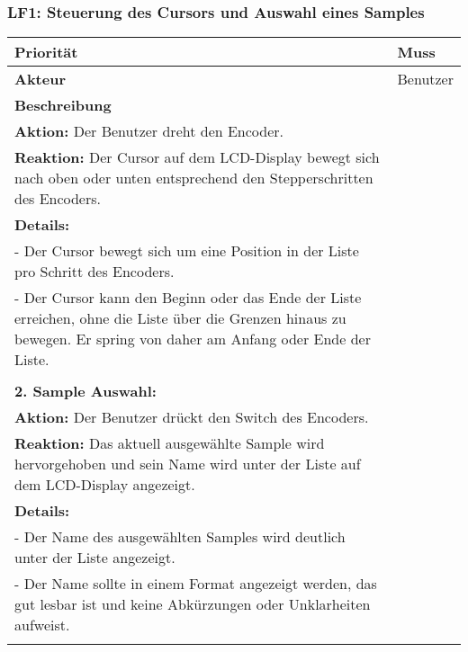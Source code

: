 \subsubsection{LF1: Steuerung des Cursors und Auswahl eines Samples}
	\hypertarget{LF01_Link}{}
\begin{longtable}[c]{|p{3cm}|p{13cm}|}
	\hline
	\textbf{Priorität} & Muss \\
	\hline
	\textbf{Akteur} & Benutzer \\
	\hline
	\textbf{Beschreibung} & 
	\begin{tabularx}{13cm}{X}
		\textbf{1. Cursor Bewegung:} \\
		\textbf{Aktion:} Der Benutzer dreht den Encoder. \\
		\textbf{Reaktion:} Der Cursor auf dem LCD-Display bewegt sich nach oben oder unten entsprechend den Stepperschritten des Encoders. \\
		\textbf{Details:} \\
		- Der Cursor bewegt sich um eine Position in der Liste pro Schritt des Encoders. \\
		- Der Cursor kann den Beginn oder das Ende der Liste erreichen, ohne die Liste über die Grenzen hinaus zu bewegen. Er spring von daher am Anfang oder Ende der Liste. \\
		\\
		\textbf{2. Sample Auswahl:} \\
		\textbf{Aktion:} Der Benutzer drückt den Switch des Encoders. \\
		\textbf{Reaktion:} Das aktuell ausgewählte Sample wird hervorgehoben und sein Name wird unter der Liste auf dem LCD-Display angezeigt. \\
		\textbf{Details:} \\
		- Der Name des ausgewählten Samples wird deutlich unter der Liste angezeigt. \\
		- Der Name sollte in einem Format angezeigt werden, das gut lesbar ist und keine Abkürzungen oder Unklarheiten aufweist. \\
	\end{tabularx} \\
	\hline
\end{longtable}

\newpage
